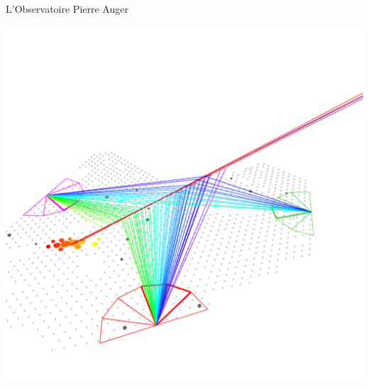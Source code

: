 \documentclass[t, compress]{beamer}
\begin{document}
\begin{frame}[c, fragile]{L'Observatoire Pierre Auger}

  \vspace{-2cm}
  \includegraphics[width=0.9\paperwidth]{figures/AugerEvent-1}

\end{frame}
\end{document}
